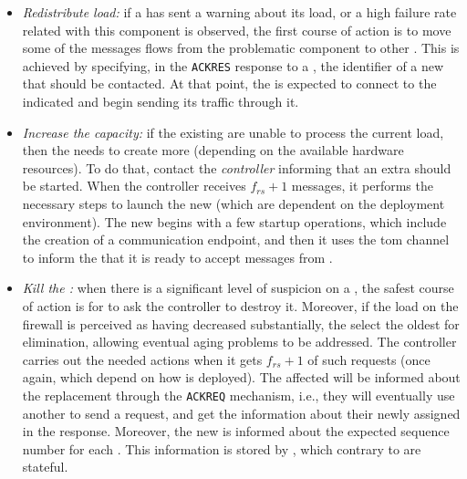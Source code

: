 \begin{itemize}


\item \emph{Redistribute load:} if a \presieve has sent a warning about its load, or a high failure rate related with this component is observed, the first course of action is to move some of the messages flows from the problematic component to other \presieve.
This is achieved by specifying, in the \texttt{ACKRES} response to a \sender, the identifier of a new \presieve that should be contacted.
At that point, the \sender is expected to connect to the indicated \presieve and begin sending its traffic through it.

\item \emph{Increase the \emph{\presieves} capacity:} if the existing \presieves are unable to process the current load, then the \sieveq needs to create more \presieves (depending on the available hardware resources).
To do that, \repsieves contact the \emph{controller} informing that an extra \presieve should be started.
When the controller receives $f_{rs} + 1$ messages, it performs the necessary steps to launch the new \presieve (which are dependent on the deployment environment).
The new \presieve begins with a few startup operations, which include the creation of a communication endpoint, and then it uses the \gls{tom} channel to inform the \repsieve that it is ready to accept messages from \senders.

\item \emph{Kill the \emph{\presieve}:} when there is a significant level of suspicion on a \presieve, the safest course of action is for \repsieves to ask the controller to destroy it.
Moreover, if the load on the firewall is perceived as having decreased substantially, the \repsieves select the oldest \presieve for elimination, allowing eventual aging problems to be addressed.
The controller carries out the needed actions when it gets $f_{rs} + 1$ of such requests (once again, which depend on how \sieveq is deployed).
The affected \senders will be informed about the \presieve replacement through the \texttt{ACKREQ} mechanism, i.e., they will eventually use another \presieve to send a request, and get the information about their newly assigned \presieve in the response.
Moreover, the new \presieve is informed about the expected sequence number for each \sender.
This information is stored by \repsieves, which contrary to \presieves are stateful.

\end{itemize}

